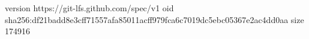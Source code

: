 version https://git-lfs.github.com/spec/v1
oid sha256:df21badd8e3cff71557afa85011acff979fca6c7019dc5ebc05367e2ac4dd0aa
size 174916
